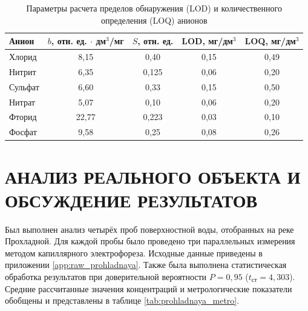 \begin{table}[H]
\centering
\caption{Параметры расчета пределов обнаружения (LOD) и количественного определения (LOQ) анионов}
\label{tab:lod_loq_calc}
\begin{tabular}{|l|c|c|c|c|}
\hline
Анион & $b$, отн. ед. $\cdot$ дм$^3$/мг & $S$, отн. ед. & LOD, мг/дм$^3$ & LOQ, мг/дм$^3$ \\ \hline
Хлорид  & 8,15  & 0,40  & 0,15 & 0,49 \\ \hline
Нитрит  & 6,35  & 0,125 & 0,06 & 0,20 \\ \hline
Сульфат & 6,60  & 0,33  & 0,15 & 0,50 \\ \hline
Нитрат  & 5,07  & 0,10  & 0,06 & 0,20 \\ \hline
Фторид  & 22,77 & 0,223 & 0,03 & 0,10 \\ \hline
Фосфат  & 9,58  & 0,25  & 0,08 & 0,26 \\ \hline
\end{tabular}
\end{table}

\section{АНАЛИЗ РЕАЛЬНОГО ОБЪЕКТА И ОБСУЖДЕНИЕ РЕЗУЛЬТАТОВ}

Был выполнен анализ четырёх проб поверхностной воды, отобранных на реке Прохладной. Для каждой пробы было проведено три параллельных измерения методом капиллярного электрофореза. Исходные данные приведены в приложении \ref{app:raw_prohladnaya}. Также была выполнена статистическая обработка результатов при доверительной вероятности $P = 0{,}95$ ($t_{\text{ст}} = 4{,}303$). Средние рассчитанные значения концентраций и метрологические показатели обобщены и представлены в таблице \ref{tab:prohladnaya_metro}.

